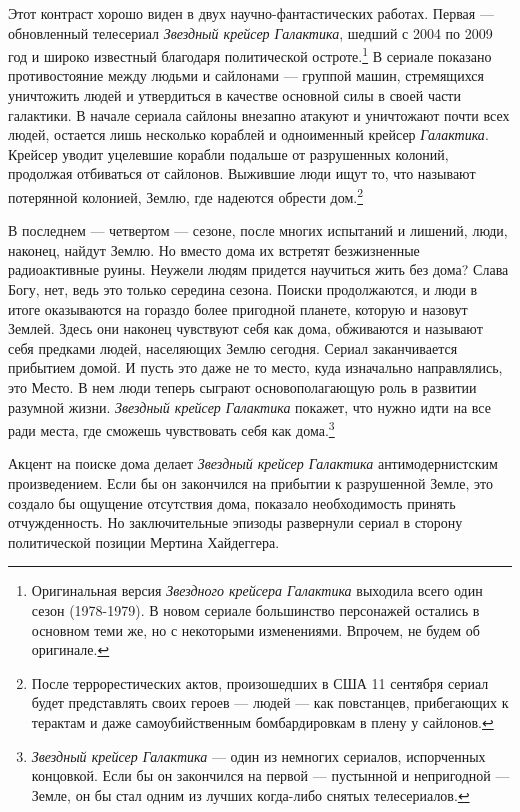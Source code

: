\documentclass[12pt]{book}
\begin{document}
Этот контраст хорошо виден в двух научно-фантастических работах. Первая --- обновленный телесериал \textit{Звездный крейсер Галактика}, шедший с 2004 по 2009 год и широко известный благодаря политической остроте.\footnote{Оригинальная версия \textit{Звездного крейсера Галактика} выходила всего один сезон (1978-1979). В новом сериале большинство персонажей остались в основном теми же, но с некоторыми изменениями. Впрочем, не будем об оригинале.} В сериале показано противостояние между людьми и сайлонами --- группой машин, стремящихся уничтожить людей и утвердиться в качестве основной силы в своей части галактики. В начале сериала сайлоны внезапно атакуют и уничтожают почти всех людей, остается лишь несколько кораблей и одноименный крейсер \textit{Галактика}. Крейсер уводит уцелевшие корабли подальше от разрушенных колоний, продолжая отбиваться от сайлонов. Выжившие люди ищут то, что называют потерянной колонией, Землю, где надеются обрести дом.\footnote{После террорестических актов, произошедших в США 11 сентября сериал будет представлять своих героев --- людей --- как повстанцев, прибегающих к терактам и даже самоубийственным бомбардировкам в плену у сайлонов.}

В последнем --- четвертом --- сезоне, после многих испытаний и лишений, люди, наконец, найдут Землю. Но вместо дома их встретят безжизненные радиоактивные руины. Неужели людям придется научиться жить без дома? Слава Богу, нет, ведь это только середина сезона. Поиски продолжаются, и люди в итоге оказываются на гораздо более пригодной планете, которую и назовут Землей. Здесь они наконец чувствуют себя как дома, обживаются и называют себя предками людей, населяющих Землю сегодня. Сериал заканчивается прибытием домой. И пусть это даже не то место, куда изначально направлялись, это Место. В нем люди теперь сыграют основополагающую роль в развитии разумной жизни. \textit{Звездный крейсер Галактика} покажет, что нужно идти на все ради места, где сможешь чувствовать себя как дома.\footnote{\textit{Звездный крейсер Галактика} --- один из немногих сериалов, испорченных концовкой. Если бы он закончился на первой --- пустынной и непригодной --- Земле, он бы стал одним из лучших когда-либо снятых телесериалов.}

Акцент на поиске дома делает \textit{Звездный крейсер Галактика} антимодернистским произведением. Если бы он закончился на прибытии к разрушенной Земле, это создало бы ощущение отсутствия дома, показало необходимость принять отчужденность. Но заключительные эпизоды развернули сериал в сторону политической позиции Мертина Хайдеггера.
\end{document}
